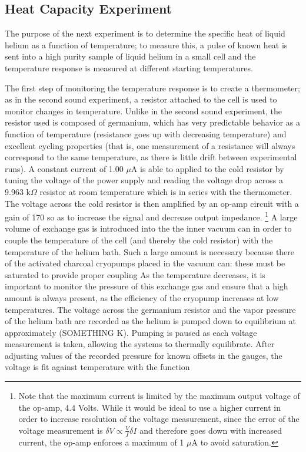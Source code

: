 \subsection{Heat Capacity Experiment}

The purpose of the next experiment is to determine the specific heat of liquid helium as a function of temperature; to measure this, a pulse of known heat is sent into a high purity sample of liquid helium in a small cell and the temperature response is measured at different starting temperatures.

The first step of monitoring the temperature response is to create a thermometer; as in the second sound experiment, a resistor attached to the cell is used to monitor changes in temperature. Unlike in the second sound experiment, the resistor used is composed of germanium, which has very predictable behavior as a function of temperature (resistance goes up with decreasing temperature) and excellent cycling properties (that is, one measurement of a resistance will always correspond to the same temperature, as there is little drift between experimental runs). A constant current of 1.00 $\mu$A is able to applied to the cold resistor by tuning the voltage of the power supply and reading the voltage drop across a 9.963 k$\Omega$ resistor at room temperature which is in series with the thermometer. The voltage across the cold resistor is then amplified by an op-amp circuit with a gain of 170 so as to increase the signal and decrease output impedance. \footnote{Note that the maximum current is limited by the maximum output voltage of the op-amp, 4.4 Volts. While it would be ideal to use a higher current in order to increase resolution of the voltage measurement, since the error of the voltage measurement is $\delta V \propto \frac{V}{I} \delta I$ and therefore goes down with increased current, the op-amp enforces a maximum of 1 $\mu$A to avoid saturation.} A large volume of exchange gas is introduced into the the inner vacuum can in order to couple the temperature of the cell (and thereby the cold resistor) with the temperature of the helium bath. Such a large amount is necessary because there of the activated charcoal cryopumps placed in the vacuum can: these must be saturated to provide proper coupling As the temperature decreases, it is important to monitor the pressure of this exchange gas and ensure that a high amount is always present, as the efficiency of the cryopump increases at low temperatures. The voltage across the germanium resistor and the vapor pressure of the helium bath are recorded as the helium is pumped down to equilibrium at approximately (SOMETHING K). Pumping is paused as each voltage measurement is taken, allowing the systems to thermally equilibrate. After adjusting values of the recorded pressure for known offsets in the gauges, the voltage is fit against temperature with the function


